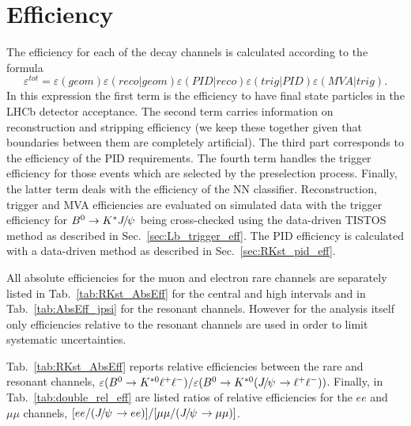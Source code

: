 \chapter{Efficiency}
\label{sec:RKst_efficiency}

The efficiency for each of the decay channels is calculated according to the formula
\begin{equation}
\varepsilon^{tot}=\varepsilon(geom)\varepsilon(reco|geom)\varepsilon(PID|reco)\varepsilon(trig|PID)\varepsilon(MVA|trig).
\end{equation}
In this expression the first term is the efficiency to have final state particles in the LHCb detector 
acceptance. The second term carries information on reconstruction and stripping efficiency
(we keep these together given that boundaries between them are completely artificial).
The third part corresponds to the efficiency of the PID requirements.
The fourth term handles the trigger efficiency for those events which are selected by the preselection process.
Finally, the latter term deals with the efficiency of the NN classifier.
Reconstruction, trigger and MVA efficiencies are evaluated on simulated data with the trigger efficiency
for $\Bz\to\Kstar\jpsi$ being cross-checked using the data-driven TISTOS method as described in Sec.~\ref{sec:Lb_trigger_eff}.
The PID efficiency is calculated with a data-driven method as described in Sec.~\ref{sec:RKst_pid_eff}.

All absolute efficiencies for the muon and electron rare channels are separately listed in Tab.~\ref{tab:RKst_AbsEff}
for the central and high \qsq intervals and in Tab.~\ref{tab:AbsEff_jpsi} for the resonant channels.
However for the analysis itself only efficiencies relative to the resonant channels are used in order
to limit systematic uncertainties.

Tab.~\ref{tab:RKst_AbsEff} reports relative efficiencies between the rare and resonant channels,
$\varepsilon(\Bz\to\Kstarz \ll)/\varepsilon(\Bz\to\Kstarz(\jpsi\to \ll))$.
Finally, in Tab.~\ref{tab:double_rel_eff} are listed ratios of relative efficiencies
for the $ee$ and $\mu\mu$ channels, $[ee/(\jpsi \to ee)] / [\mu\mu/(\jpsi\to \mu\mu)]$.

